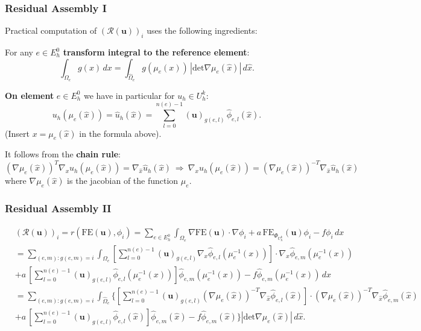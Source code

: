 \begin{frame}
\frametitle{Residual Assembly I}
Practical computation of $(\mathcal{R}(\mathbf{u}) )_i$ uses the following ingredients:

For any $e\in E_h^0$ \textbf{transform integral to the reference element}:
\begin{equation*}
\int_{\Omega_e} g(x) \, dx = \int_{\hat\Omega_e} g(\mu_e(x)) \,|\text{det} \nabla\mu_e(\hat{x})| \, d\hat{x} .
\end{equation*}

\smallskip
\textbf{On element} $e\in E_h^0$ we have in particular for $u_h \in U_h^k$:
\begin{equation*}
u_h(\mu_e(\hat{x})) = \hat{u}_h(\hat{x}) = \sum_{l=0}^{n(e)-1} (\mathbf{u})_{g(e,l)} \,\hat{\phi}_{e,l}(\hat{x}) .
\end{equation*}
(Insert $x=\mu_e(\hat{x})$ in the formula above).

\smallskip
It follows from the \textbf{chain rule}:
{\small
\begin{equation*}
(\nabla\mu_e(\hat{x}))^{T} \nabla_{x} u_h(\mu_e(\hat{x})) = \nabla_{\hat{x}} \hat{u}_h(\hat{x})
\ \Rightarrow \
\nabla_{x} u_h(\mu_e(\hat{x})) = (\nabla\mu_e(\hat{x}))^{-T} \nabla_{\hat{x}} \hat{u}_h(\hat{x})
\end{equation*}}
where $\nabla\mu_e(\hat{x})$ is the jacobian of the function $\mu_e$.

\end{frame}

\begin{frame}
\frametitle{Residual Assembly II}
{\small
\begin{equation*}
\begin{split}
&(\mathcal{R}(\mathbf{u}) )_i  = r\left(\text{FE}(\mathbf{u}),\phi_i\right)
= \sum_{e\in E_h^0} \int_{\Omega_e} \nabla \text{FE}(\mathbf{u}) \cdot \nabla\phi_i
+ a \, \text{FE}_{\Phi_{U_h^k}}(\mathbf{u}) \phi_i - f \phi_i \,dx\\
&= \sum_{(e,m) : g(e,m)=i} \int_{\Omega_e}
\left[ \sum_{l=0}^{n(e)-1} (\mathbf{u})_{g(e,l)} \nabla_x \hat\phi_{e,l}(\mu_e^{-1}(x))\right]
\cdot \nabla_x \hat\phi_{e,m}(\mu_e^{-1}(x))\\
& + a \, \left[ \sum_{l=0}^{n(e)-1} (\mathbf{u})_{g(e,l)} \hat\phi_{e,l}(\mu_e^{-1}(x))\right] \hat\phi_{e,m}(\mu_e^{-1}(x))
- f \hat\phi_{e,m}(\mu_e^{-1}(x)) \, dx\\
&= \sum_{(e,m) : g(e,m)=i} \int_{\hat\Omega_e}
\Biggl\{\left[ \sum_{l=0}^{n(e)-1} (\mathbf{u})_{g(e,l)} (\nabla \mu_e(\hat{x}))^{-T}\nabla_{\hat{x}} \hat\phi_{e,l}(\hat{x})\right]
\cdot (\nabla \mu_e(\hat{x}))^{-T} \nabla_{\hat{x}} \hat\phi_{e,m}(\hat{x})\\
& + a \, \left[ \sum_{l=0}^{n(e)-1} (\mathbf{u})_{g(e,l)} \hat\phi_{e,l}(\hat{x}) \right] \hat\phi_{e,m}(\hat{x})
- f \hat\phi_{e,m}(\hat{x}) \Biggr\} |\text{det} \nabla\mu_e(\hat{x})| \, d\hat{x} .
\end{split}
\end{equation*}}
\end{frame}

